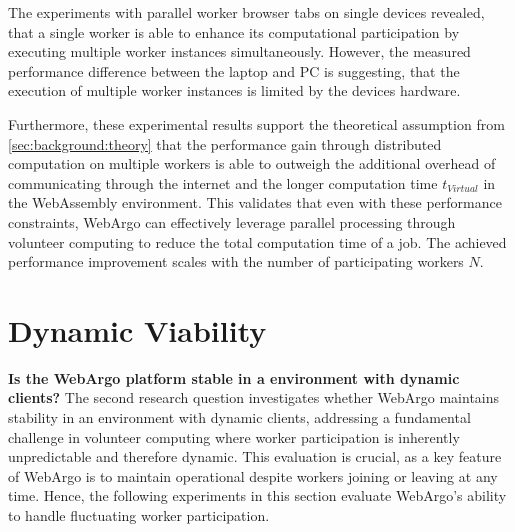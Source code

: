 The experiments with parallel worker browser tabs on single devices revealed, that a single worker is able to enhance its computational participation by executing multiple worker instances simultaneously. However, the measured performance difference between the laptop and \acs{PC} is suggesting, that the execution of multiple worker instances is limited by the devices hardware.

Furthermore, these experimental results support the theoretical assumption from \autoref{sec:background:theory} that the performance gain through distributed computation on multiple workers is able to outweigh the additional overhead of communicating through the internet and the longer computation time $t_{Virtual}$ in the WebAssembly environment. This validates that even with these performance constraints, WebArgo can effectively leverage parallel processing through volunteer computing to reduce the total computation time of a job. The achieved performance improvement scales with the number of participating workers $N$.

\section{Dynamic Viability}
\label{sec:evaluation:dynamic}
\textbf{Is the WebArgo platform stable in a environment with dynamic clients?}
\newline
The second research question investigates whether WebArgo maintains stability in an environment with dynamic clients, addressing a fundamental challenge in volunteer computing where worker participation is inherently unpredictable and therefore dynamic. This evaluation is crucial, as a key feature of WebArgo is to maintain operational despite workers joining or leaving at any time. Hence, the following experiments in this section evaluate WebArgo's ability to handle fluctuating worker participation.

